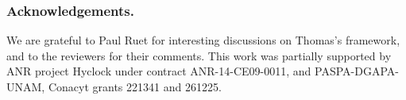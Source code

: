 \documentclass{llncs}
\begin{document}
\subsubsection*{Acknowledgements.}
We are grateful to Paul Ruet for interesting discussions on Thomas's framework, and to the reviewers for their comments.
This work was partially supported by ANR project Hyclock under contract
ANR-14-CE09-0011, and PASPA-DGAPA-UNAM, Conacyt grants 221341 and 261225.




\appendix
\end{document}
